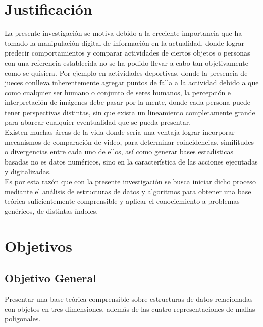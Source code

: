\documentclass[11pt,letterpaper]{article}     %
\begin{document}
\section{Justificación}
La presente investigaci\' on se motiva debido a la creciente importancia que ha tomado la manipulaci\' on digital de informaci\' on en la actualidad, donde lograr predecir comportamientos y comparar actividades de ciertos objetos o personas con una referencia establecida no se ha podido llevar a cabo tan objetivamente como se quisiera. Por ejemplo en actividades deportivas, donde la presencia de jueces conlleva inherentemente agregar puntos de falla a la actividad debido a que como cualquier ser humano o conjunto de seres humanos, la percepci\' on e interpretaci\' on de im\' agenes debe pasar por la mente, donde cada persona puede tener perspectivas distintas, sin que exista un lineamiento completamente grande para abarcar cualquier eventualidad que se pueda presentar.\\
Existen muchas \' areas de la vida donde seria una ventaja lograr incorporar mecanismos de comparaci\' on de video, para determinar coincidencias, similitudes o divergencias entre cada uno de ellos, as\'i como generar bases estad\' isticas basadas no es datos num\' ericos, sino en la caracter\' istica de las acciones ejecutadas y digitalizadas.\\
Es por esta raz\' on que con la presente investigaci\' on se busca iniciar dicho proceso mediante el an\' alisis de estructuras de datos y algoritmos para obtener una base te\' orica suficientemente comprensible y aplicar el conociemiento a problemas gen\' ericos, de distintas \' indoles.


\section{Objetivos}
\subsection{Objetivo General}
Presentar una base te\' orica comprensible sobre estructuras de datos relacionadas con objetos en tres dimensiones, adem\' as de las cuatro representaciones de mallas poligonales.
\end{document}
